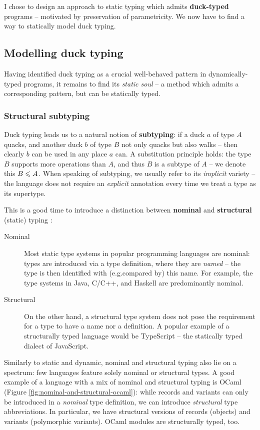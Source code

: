 I chose to design an approach to static typing which admits \textbf{duck-typed} programs -- motivated by preservation of parametricity. 
We now have to find a way to statically model duck typing.

\subsection{Modelling duck typing}
\label{subsec:duck-models}

Having identified duck typing as a crucial well-behaved pattern in dynamically-typed programs, it remains to find its \emph{static soul} -- a method which admits a corresponding pattern, but can be statically typed.

\subsubsection{Structural subtyping}

Duck typing leads us to a natural notion of \textbf{subtyping}: if a duck $a$ of type $A$ quacks, and another duck $b$ of type $B$ not only quacks but also walks -- then clearly $b$ can be used in any place $a$ can. A substitution principle holds: the type $B$ supports more operations than $A$, and thus $B$ is a subtype of $A$ -- we denote this $B \leqslant A$. When speaking of subtyping, we usually refer to its \emph{implicit} variety -- the language does not require an \emph{explicit} annotation every time we treat a type as its supertype.

\needspace{1em}
This is a good time to introduce a distinction between \textbf{nominal} and \textbf{structural} (static) typing \cite{tapl}: \begin{description}
    \item[Nominal] Most static type systems in popular programming languages are nominal: types are introduced via a type definition, where they are \emph{named} -- the type is then identified with (e.g.\@ compared by) this name. For example, the type systems in Java, C/C++, and Haskell are predominantly nominal.
    \item[Structural] On the other hand, a structural type system does not pose the requirement for a type to have a name nor a definition. A popular example of a structurally typed language would be TypeScript -- the statically typed dialect of JavaScript. 
\end{description}
Similarly to static and dynamic, nominal and structural typing also lie on a spectrum: few languages feature solely nominal or structural types. A good example of a language with a mix of nominal and structural typing is OCaml (Figure \ref{fig:nominal-and-structural-ocaml}): while records and variants can only be introduced in a \emph{nominal} type definition, we can introduce \emph{structural} type abbreviations. In particular, we have structural versions of records (objects) and variants (polymorphic variants). OCaml modules are structurally typed, too.

